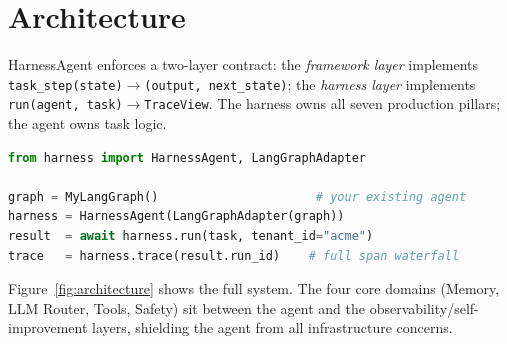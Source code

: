 \documentclass[conference]{IEEEtran}
\begin{document}
\section{Architecture}
\label{sec:architecture}

HarnessAgent enforces a two-layer contract: the \emph{framework layer}
implements \texttt{task\_step(state)\;$\to$\;(output,\,next\_state)};
the \emph{harness layer} implements
\texttt{run(agent,\,task)\;$\to$\;TraceView}.
The harness owns all seven production pillars; the agent owns task logic.

\begin{lstlisting}[language=Python,caption={Four-line integration}]
from harness import HarnessAgent, LangGraphAdapter

graph = MyLangGraph()                      # your existing agent
harness = HarnessAgent(LangGraphAdapter(graph))
result  = await harness.run(task, tenant_id="acme")
trace   = harness.trace(result.run_id)    # full span waterfall
\end{lstlisting}

Figure~\ref{fig:architecture} shows the full system. The four core
domains (Memory, LLM Router, Tools, Safety) sit between the agent and
the observability/self-improvement layers, shielding the agent from all
infrastructure concerns.
\end{document}
